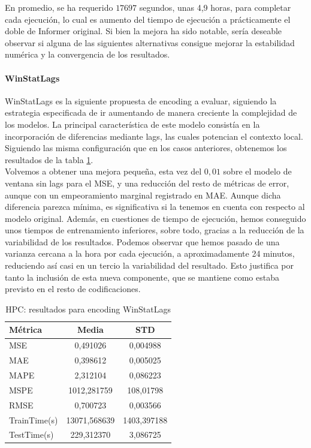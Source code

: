 En promedio, se ha requerido $17697$ segundos, unas 4,9 horas, para completar cada ejecución, lo cual es aumento del tiempo de ejecución a prácticamente el doble de Informer original. Si bien la mejora ha sido notable, sería deseable observar si alguna de las siguientes alternativas consigue mejorar la estabilidad numérica y la convergencia de los resultados.

\paragraph{WinStatLags}

WinStatLags es la siguiente propuesta de encoding a evaluar, siguiendo la estrategia especificada de ir aumentando de manera creciente la complejidad de los modelos. La principal característica de este modelo consistía en la incorporación de diferencias mediante lags, las cuales potencian el contexto local. Siguiendo las misma configuración que en los casos anteriores, obtenemos los resultados de la tabla \ref{hpcwinlags}.\\

Volvemos a obtener una mejora pequeña, esta vez del $0,01$ sobre el modelo de ventana sin lags para el MSE, y una reducción del resto de métricas de error, aunque con un empeoramiento marginal registrado en MAE. Aunque dicha diferencia parezca mínima, es significativa si la tenemos en cuenta con respecto al modelo original. Además, en cuestiones de tiempo de ejecución, hemos conseguido unos tiempos de entrenamiento inferiores, sobre todo, gracias a la reducción de la variabilidad de los resultados. Podemos observar que hemos pasado de una varianza cercana a la hora por cada ejecución, a aproximadamente 24 minutos, reduciendo así casi en un tercio la variabilidad del resultado. Esto justifica por tanto la inclusión de esta nueva componente, que se mantiene como estaba previsto en el resto de codificaciones.


\begin{table}[!ht]
	\centering
	\begin{tabular}{l|c|c}
		\toprule
		Métrica & Media & STD \\
		\midrule
		MSE & 0,491026 & 0,004988 \\
		MAE & 0,398612 & 0,005025 \\
		MAPE & 2,312104 & 0,086223 \\
		MSPE & 1012,281759 & 108,01798 \\
		RMSE & 0,700723 & 0,003566 \\
		TrainTime(s) & 13071,568639 & 1403,397188 \\
		TestTime(s) & 229,312370 & 3,086725 \\
		\bottomrule
	\end{tabular}
	\caption{HPC: resultados para encoding WinStatLags}
	\label{hpcwinlags}
\end{table}

